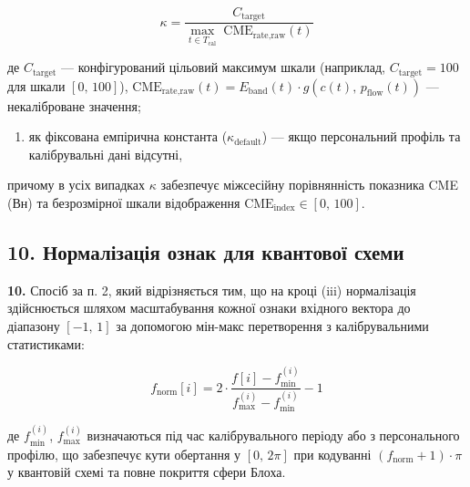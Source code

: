 \documentclass[12pt,a4paper]{article}
\begin{document}
\[\kappa = \frac{C_{\text{target}}}{\displaystyle\max_{t \in T_{\text{cal}}}\;\text{CME}_{\text{rate,raw}}(t)}\]



де \(C_{\text{target}}\) --- конфігурований цільовий максимум шкали (наприклад, \(C_{\text{target}} = 100\) для шкали \([0,\,100]\)), \(\text{CME}_{\text{rate,raw}}(t) = E_{\text{band}}(t) \cdot g(c(t),\,p_{\text{flow}}(t))\) --- некаліброване значення;



\begin{enumerate}

\def\labelenumi{(\roman{enumi})}

\setcounter{enumi}{2}

\tightlist

\item

  як фіксована емпірична константа (\(\kappa_{\text{default}}\)) --- якщо персональний профіль та калібрувальні дані відсутні,

\end{enumerate}



причому в усіх випадках \(\kappa\) забезпечує міжсесійну порівнянність показника CME (Вн) та безрозмірної шкали відображення \(\text{CME}_{\text{index}} \in [0,\,100]\).



\subsection{10. Нормалізація ознак для квантової схеми}\label{ux43dux43eux440ux43cux430ux43bux456ux437ux430ux446ux456ux44f-ux43eux437ux43dux430ux43a-ux434ux43bux44f-ux43aux432ux430ux43dux442ux43eux432ux43eux457-ux441ux445ux435ux43cux438}



\textbf{10.} Спосіб за п. 2, який відрізняється тим, що на кроці (iii) нормалізація здійснюється шляхом масштабування кожної ознаки вхідного вектора до діапазону \([-1,\,1]\) за допомогою мін-макс перетворення з калібрувальними статистиками:



\[f_{\text{norm}}[i] = 2 \cdot \frac{f[i] - f_{\min}^{(i)}}{f_{\max}^{(i)} - f_{\min}^{(i)}} - 1\]



де \(f_{\min}^{(i)}\), \(f_{\max}^{(i)}\) визначаються під час калібрувального періоду або з персонального профілю, що забезпечує кути обертання у \([0,\,2\pi]\) при кодуванні \((f_{\text{norm}} + 1) \cdot \pi\) у квантовій схемі та повне покриття сфери Блоха.
\end{document}

